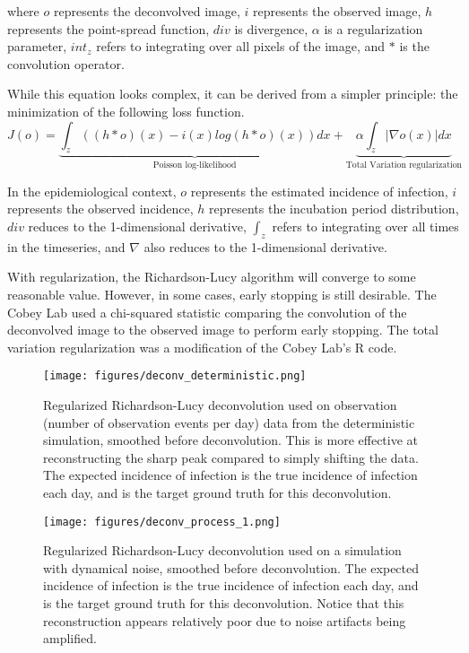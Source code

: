 \documentclass{article}
\begin{document}
where $o$ represents the deconvolved image, $i$ represents the observed image, $h$ represents the point-spread function, $div$ is divergence, $\alpha$ is a regularization parameter, $int_z$ refers to integrating over all pixels of the image, and $*$ is the convolution operator.

While this equation looks complex, it can be derived from a simpler principle: the minimization of the following loss function. 
\begin{equation}
    J(o) = \underbrace{\int_z ((h*o)(x) - i(x) log(h*o)(x))dx}_{\mbox{Poisson log-likelihood}} + \underbrace{\alpha \int_z |\nabla o(x)| dx}_{\mbox{Total Variation regularization}}
\end{equation}


In the epidemiological context, $o$ represents the estimated incidence of infection, $i$ represents the observed incidence, $h$ represents the incubation period distribution, $div$ reduces to the 1-dimensional derivative,  $\int_z$ refers to integrating over all times in the timeseries, and $\nabla$ also reduces to the 1-dimensional derivative.

With regularization, the Richardson-Lucy algorithm will converge to some reasonable value. However, in some cases, early stopping is still desirable. The Cobey Lab used a chi-squared statistic comparing the convolution of the deconvolved image to the observed image to perform early stopping. The total variation regularization was a modification of the Cobey Lab's R code.

\clearpage
\begin{figure}[h!]
    \centering
    \texttt{[image: figures/deconv\_deterministic.png]}
    \caption{Regularized Richardson-Lucy deconvolution used on observation (number of observation events per day) data from the deterministic simulation, smoothed before deconvolution. This is more effective at reconstructing the sharp peak compared to simply shifting the data. The expected incidence of infection is the true incidence of infection each day, and is the target ground truth for this deconvolution.}
    \label{fig:my_label}
\end{figure}

\clearpage
\begin{figure}[h!]
    \centering
    \texttt{[image: figures/deconv\_process\_1.png]}
    \caption{Regularized Richardson-Lucy deconvolution used on a simulation with dynamical noise, smoothed before deconvolution. The expected incidence of infection is the true incidence of infection each day, and is the target ground truth for this deconvolution. Notice that this reconstruction appears relatively poor due to noise artifacts being amplified.}
    \label{fig:my_label}
\end{figure}
\end{document}
